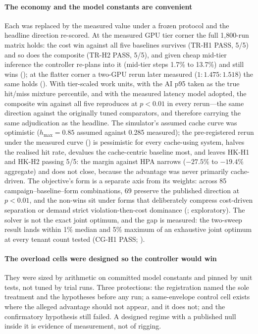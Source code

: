 \paragraph{The economy and the model constants are convenient} Each was
replaced by the measured value under a frozen protocol and the headline
direction re-scored. At the measured GPU tier corner the full 1,800-run
matrix holds: the cost win against all five baselines survives (TR-H1
PASS, 5/5) and so does the composite (TR-H2 PASS, 5/5), and given cheap
mid-tier inference the controller re-plans into it (mid-tier steps 1.7\%
to 13.7\%) and still wins (); at the
flatter corner a two-GPU rerun later measured ($1{:}1.475{:}1.518$) the
same holds (). With tier-scaled work
units, with the AI p95 taken as the true hit/miss mixture percentile, and
with the measured latency model adopted, the composite win against all
five reproduces at $p < 0.01$ in every rerun---the same direction against
the originally tuned comparators, and therefore carrying the same
adjudication as the headline. The simulator's assumed cache curve was
optimistic ($h_{\max} = 0.85$ assumed against 0.285 measured); the
pre-registered rerun under the measured curve
() is pessimistic for every cache-using
system, halves the realised hit rate, devalues the cache-centric baseline
most, and leaves HK-H1 and HK-H2 passing 5/5: the margin against HPA
narrows ($-27.5\%$ to $-19.4\%$ aggregate) and does not close, because the
advantage was never primarily cache-driven. The objective's form is a
separate axis from its weights: across 85 campaign--baseline--form
combinations, 69 preserve the published direction at $p < 0.01$, and the
non-wins sit under forms that deliberately compress cost-driven
separation or demand strict violation-then-cost dominance
(; exploratory). The solver is not the exact
joint optimum, and the gap is measured: the two-sweep result lands within
1\% median and 5\% maximum of an exhaustive joint optimum at every tenant
count tested (CG-H1 PASS; ).

\paragraph{The overload cells were designed so the controller would win}
They were sized by arithmetic on committed model constants and pinned by
unit tests, not tuned by trial runs. Three protections: the registration
named the sole treatment and the hypotheses before any run; a
same-envelope control cell exists where the alleged advantage should not
appear, and it does not; and the confirmatory hypothesis still failed. A
designed regime with a published null inside it is evidence of measurement,
not of rigging.

